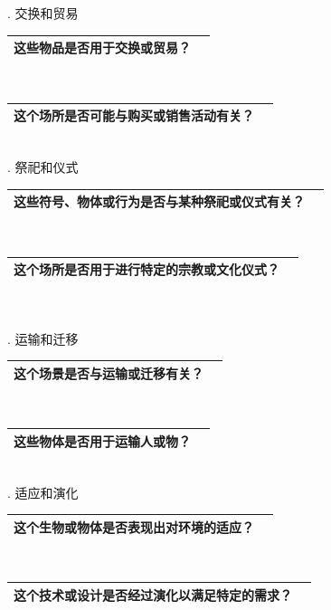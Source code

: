 \documentclass[12pt]{book}
\begin{document}
. 交换和贸易

\begin{tabular}{|p{15cm}|p{3cm}|}
	\hline
这些物品是否用于交换或贸易？\\
	\hline
\end{tabular}\\


\begin{tabular}{|p{15cm}|p{3cm}|}
	\hline
这个场所是否可能与购买或销售活动有关？\\
	\hline
\end{tabular}\\

. 祭祀和仪式

\begin{tabular}{|p{15cm}|p{3cm}|}
	\hline
这些符号、物体或行为是否与某种祭祀或仪式有关？\\
	\hline
\end{tabular}\\



\begin{tabular}{|p{15cm}|p{3cm}|}
	\hline
这个场所是否用于进行特定的宗教或文化仪式？\\
	\hline
\end{tabular}\\\\



. 运输和迁移

\begin{tabular}{|p{15cm}|p{3cm}|}
	\hline
这个场景是否与运输或迁移有关？\\
	\hline
\end{tabular}\\



\begin{tabular}{|p{15cm}|p{3cm}|}
	\hline
这些物体是否用于运输人或物？\\
	\hline
\end{tabular}\\


. 适应和演化

\begin{tabular}{|p{15cm}|p{3cm}|}
	\hline
这个生物或物体是否表现出对环境的适应？\\
	\hline
\end{tabular}\\


\begin{tabular}{|p{15cm}|p{3cm}|}
	\hline
这个技术或设计是否经过演化以满足特定的需求？\\
	\hline
\end{tabular}\\
\end{document}
